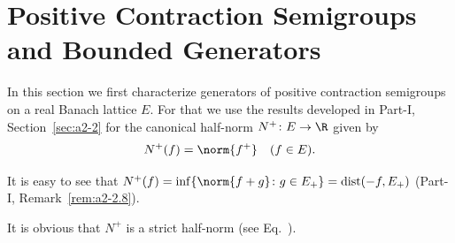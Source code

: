 \section{Positive Contraction Semigroups and Bounded Generators}\label{sec:c2-1}%
In this section we first characterize generators of positive contraction semigroups on a real Banach lattice $E$.
For that we use the results developed in Part-I, Section~\ref{sec:a2-2} for the canonical half-norm $N^{+} \colon E \to \R$ given by
\begin{equation}\label{eq:c2-1.1}
N^{+}(f) = \norm{f^{+}} \quad (f \in E).
\end{equation}
\begin{remark*}\label{rem:c2-1.1}
%
It is easy to see that $N^{+}(f) = \inf \{\norm{f+g} \colon g \in E_{+}\} = \text{dist}(-f,E_{+})$ (\cf Part-I, Remark~\ref{rem:a2-2.8}). 
\end{remark*}
It is obvious that $N^{+}$ is a strict half-norm (see Eq.~). 

